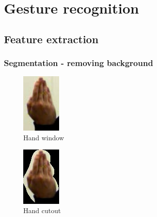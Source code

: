 
\chapter{Gesture recognition}
\label{ch:gestures}



\section{Feature extraction}



\subsection*{Segmentation - removing background}
\begin{figure}
        \center
        \includegraphics[width=0.4\linewidth]{figures/pipeline/lefthand.jpg}
        \caption{Hand window }
        \label{fig:lefthandwindow}
\end{figure}
\begin{figure}
        \center
        \includegraphics[width=0.4\linewidth]{figures/pipeline/lefthandcutout.jpg}
        \caption{Hand cutout }
        \label{fig:lefthandcutout}
\end{figure}
